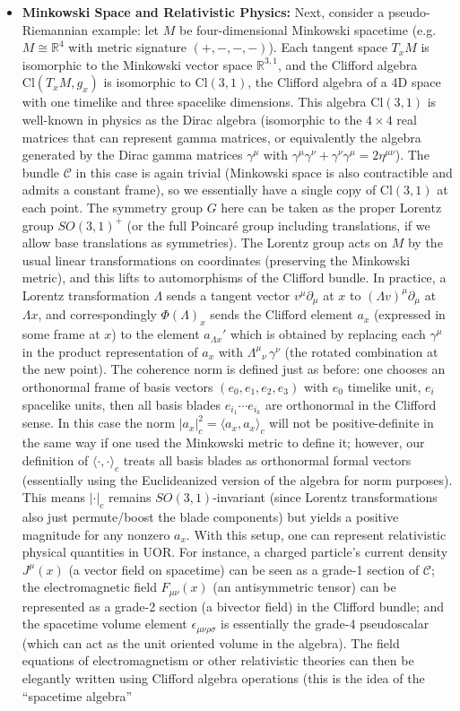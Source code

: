 \documentclass[12pt]{article}
\newcommand{\Cl}{\mathrm{Cl}}
\begin{document}
\begin{itemize}
    \item \textbf{Minkowski Space and Relativistic Physics:} Next, consider a pseudo-Riemannian example: let $M$ be four-dimensional Minkowski spacetime (e.g. $M \cong \mathbb{R}^4$ with metric signature $(+,-,-,-)$). Each tangent space $T_x M$ is isomorphic to the Minkowski vector space $\mathbb{R}^{3,1}$, and the Clifford algebra $\Cl(T_xM, g_x)$ is isomorphic to $\Cl(3,1)$, the Clifford algebra of a 4D space with one timelike and three spacelike dimensions. This algebra $\Cl(3,1)$ is well-known in physics as the Dirac algebra (isomorphic to the $4\times4$ real matrices that can represent gamma matrices, or equivalently the algebra generated by the Dirac gamma matrices $\gamma^\mu$ with $\gamma^\mu \gamma^\nu + \gamma^\nu \gamma^\mu = 2\eta^{\mu\nu}$). The bundle $\mathcal{C}$ in this case is again trivial (Minkowski space is also contractible and admits a constant frame), so we essentially have a single copy of $\Cl(3,1)$ at each point. The symmetry group $G$ here can be taken as the proper Lorentz group $SO(3,1)^+$ (or the full Poincaré group including translations, if we allow base translations as symmetries). The Lorentz group acts on $M$ by the usual linear transformations on coordinates (preserving the Minkowski metric), and this lifts to automorphisms of the Clifford bundle. In practice, a Lorentz transformation $\Lambda$ sends a tangent vector $v^\mu \partial_\mu$ at $x$ to $(\Lambda v)^\mu \partial_\mu$ at $\Lambda x$, and correspondingly $\Phi(\Lambda)_x$ sends the Clifford element $a_x$ (expressed in some frame at $x$) to the element $a_{\Lambda x}'$ which is obtained by replacing each $\gamma^\mu$ in the product representation of $a_x$ with $\Lambda^\mu{}_{\nu}\, \gamma^\nu$ (the rotated combination at the new point). The coherence norm is defined just as before: one chooses an orthonormal frame of basis vectors $(e_0,e_1,e_2,e_3)$ with $e_0$ timelike unit, $e_i$ spacelike units, then all basis blades $e_{i_1}\cdots e_{i_k}$ are orthonormal in the Clifford sense. In this case the norm $|a_x|_c^2 = \langle a_x, a_x\rangle_c$ will not be positive-definite in the same way if one used the Minkowski metric to define it; however, our definition of $\langle\cdot,\cdot\rangle_c$ treats all basis blades as orthonormal formal vectors (essentially using the Euclideanized version of the algebra for norm purposes). This means $|\cdot|_c$ remains $SO(3,1)$-invariant (since Lorentz transformations also just permute/boost the blade components) but yields a positive magnitude for any nonzero $a_x$. With this setup, one can represent relativistic physical quantities in UOR. For instance, a charged particle’s current density $J^\mu(x)$ (a vector field on spacetime) can be seen as a grade-1 section of $\mathcal{C}$; the electromagnetic field $F_{\mu\nu}(x)$ (an antisymmetric tensor) can be represented as a grade-2 section (a bivector field) in the Clifford bundle; and the spacetime volume element $\epsilon_{\mu\nu\rho\sigma}$ is essentially the grade-4 pseudoscalar (which can act as the unit oriented volume in the algebra). The field equations of electromagnetism or other relativistic theories can then be elegantly written using Clifford algebra operations (this is the idea of the “spacetime algebra” 
\end{itemize}
\end{document}
